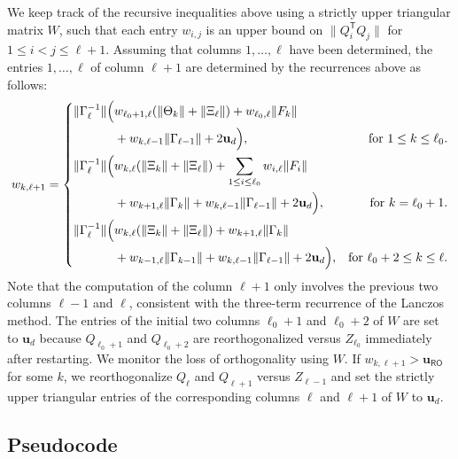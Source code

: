 \documentclass{siamart190516}
\newcommand{\Ttran}{\mathsf{T}}
\newcommand{\Ta}{\Xi}
\newcommand{\Tb}{\Gamma}
\newcommand{\mpr}{\mathbf{u}}
\providecommand{\norm}[1]{\lVert#1\rVert}
\begin{document}
We keep track of the recursive inequalities above using a strictly upper triangular matrix $W$, such that each entry $w_{i,j}$ is an upper bound on $\norm{Q_{i}^{\Ttran}Q_{j}}$ for $1\leq i< j\leq \ell+1$. Assuming that columns $1,\ldots, \ell$ have been determined, the entries $1,\ldots, \ell$ of column $\ell+1$ are determined by the recurrences above as follows:
\begin{equation*}
    w_{k,\ell+1} = \left\{
    \begin{aligned}
        \norm{\Gamma_{\ell}^{-1}}\Bigl(&w_{\ell_{0}+1,\ell}(\norm{\Theta_{k}}+\norm{\Ta_{\ell}})+w_{\ell_{0},\ell} \norm{F_{k}}\\ 
        &+w_{k,\ell-1}\norm{\Tb_{\ell-1}}+2\mpr_{d}\Bigr), &\!\!\!\!\!\!\!\!\text{for } 1\leq k\leq \ell_{0}.\\ 
        \norm{\Gamma_{\ell}^{-1}}\Bigl(&w_{k,\ell}(\norm{\Ta_{k}}+\norm{\Ta_{\ell}})+\sum_{1\leq i\leq \ell_{0}}w_{i,\ell } \norm{F_{i}}\\ 
        &+w_{k+1,\ell}\norm{\Tb_{k}} + w_{k,\ell-1}\norm{\Tb_{\ell-1}}+2\mpr_{d}\Bigr),&\!\!\!\!\!\!\text{for } k=\ell_{0}+1.\\ 
        \norm{\Gamma_{\ell}^{-1}}\Bigl(&w_{k,\ell}(\norm{\Ta_{k}}+\norm{\Ta_{\ell}})+w_{k+1,\ell}\norm{\Tb_{k}}\\ 
        &+w_{k-1,\ell}\norm{\Tb_{k-1}}+w_{k,\ell-1}\norm{\Tb_{\ell-1}}+2\mpr_{d}\Bigr),&\text{for } \ell_{0}+2\leq k\leq \ell.
    \end{aligned}
    \right.
\end{equation*}
Note that the computation of the column $\ell+1$ only involves the previous two columns $\ell-1$ and $\ell$, consistent with the three-term recurrence of the Lanczos method.
The entries of the initial two columns $\ell_{0}+1$ and $\ell_{0}+2$ of $W$ are set to 
$\mpr_{d}$ because $Q_{\ell_{0}+1}$ and $Q_{\ell_{0}+2}$ are reorthogonalized versus $Z_{\ell_{0}}$ immediately after restarting.
We monitor the loss of orthogonality using $W$.
If $w_{k,\ell+1} >\mpr_{\mathsf{RO}}$ for some $k$, we reorthogonalize $Q_{\ell}$ and $Q_{\ell+1}$ versus $Z_{\ell-1}$ and set the strictly upper triangular entries of the corresponding columns $\ell$ and $\ell+1$ of $W$ to $\mpr_{d}$.

\subsection{Pseudocode}
\end{document}
